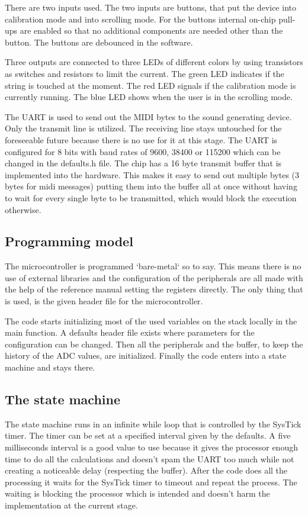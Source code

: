 \documentclass{article}
\begin{document}
There are two inputs used. The two inputs are buttons, that put the device into calibration mode and into scrolling mode. For the buttons internal on-chip pull-ups are enabled so that no additional components are needed other than the button. The buttons are debounced in the software.

Three outputs are connected to three LEDs of different colors by using transistors as switches and resistors to limit the current. The green LED indicates if the string is touched at the moment. The red LED signals if the calibration mode is currently running. The blue LED shows when the user is in the scrolling mode.

The UART is used to send out the MIDI bytes to the sound generating device. Only the transmit line is utilized. The receiving line stays untouched for the foreseeable future because there is no use for it at this stage. The UART is configured for 8 bits with baud rates of 9600, 38400 or 115200 which can be changed in the defaults.h file. The chip has a 16 byte transmit buffer that is implemented into the hardware. This makes it easy to send out multiple bytes (3 bytes for midi messages) putting them into the buffer all at once without having to wait for every single byte to be transmitted, which would block the execution otherwise.

\subsection{Programming model}
The microcontroller is programmed `bare-metal` so to say. This means there is no use of external libraries and the configuration of the peripherals are all made with the help of the reference manual setting the registers directly. The only thing that is used, is the given header file for the microcontroller.

The code starts initializing most of the used variables on the stack locally in the main function. A defaults header file exists where parameters for the configuration can be changed. Then all the peripherals and the buffer, to keep the history of the ADC values, are initialized. Finally the code enters into a state machine and stays there.

\subsection{The state machine}

The state machine runs in an infinite while loop that is controlled by the SysTick timer. The timer can be set at a specified interval given by the defaults. A five milliseconds interval is a good value to use because it gives the processor enough time to do all the calculations and doesn't spam the UART too much while not creating a noticeable delay (respecting the buffer). After the code does all the processing it waits for the SysTick timer to timeout and repeat the process. The waiting is blocking the processor which is intended and doesn't harm the implementation at the current stage.
\end{document}
